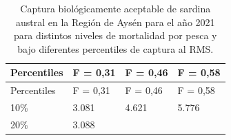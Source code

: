 \documentclass[
  spanish,
]{article}
\begin{document}
\begin{longtable}[]{@{}llll@{}}
\caption{\label{Tab12} Captura biológicamente aceptable de sardina
austral en la Región de Aysén para el año 2021 para distintos niveles de
mortalidad por pesca y bajo diferentes percentiles de captura al
RMS.}\tabularnewline
\toprule
\begin{minipage}[b]{0.17\columnwidth}\raggedright
Percentiles\strut
\end{minipage} & \begin{minipage}[b]{0.14\columnwidth}\raggedright
F = 0,31\strut
\end{minipage} & \begin{minipage}[b]{0.14\columnwidth}\raggedright
F = 0,46\strut
\end{minipage} & \begin{minipage}[b]{0.14\columnwidth}\raggedright
F = 0,58\strut
\end{minipage}\tabularnewline
\midrule
\endfirsthead
\toprule
\begin{minipage}[b]{0.17\columnwidth}\raggedright
Percentiles\strut
\end{minipage} & \begin{minipage}[b]{0.14\columnwidth}\raggedright
F = 0,31\strut
\end{minipage} & \begin{minipage}[b]{0.14\columnwidth}\raggedright
F = 0,46\strut
\end{minipage} & \begin{minipage}[b]{0.14\columnwidth}\raggedright
F = 0,58\strut
\end{minipage}\tabularnewline
\midrule
\endhead
\begin{minipage}[t]{0.17\columnwidth}\raggedright
10\%\strut
\end{minipage} & \begin{minipage}[t]{0.14\columnwidth}\raggedright
3.081\strut
\end{minipage} & \begin{minipage}[t]{0.14\columnwidth}\raggedright
4.621\strut
\end{minipage} & \begin{minipage}[t]{0.14\columnwidth}\raggedright
5.776\strut
\end{minipage}\tabularnewline
\begin{minipage}[t]{0.17\columnwidth}\raggedright
20\%\strut
\end{minipage} & \begin{minipage}[t]{0.14\columnwidth}\raggedright
3.088\strut
\end{minipage} & \begin{minipage}[t]{0.14\columnwidth}\raggedright

\end{minipage}
\end{longtable}
\end{document}
